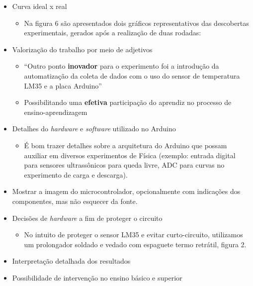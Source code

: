 \documentclass{article}
\begin{document}
\begin{itemize}
\begin{itemize}
\begin{itemize}
			\item No total, 96 ensaios foram realizados no intervalo de 480 minutos (média de 5 minutos por ensaio). Por fim, foram calculados o percentual [\dots] \cite{rogerio}
		\end{itemize}
		\item Curva ideal x real
		\begin{itemize}
			\item Na figura 6 são apresentados dois gráficos representativos das descobertas experimentais, gerados após a realização de duas rodadas: \cite{rogerio}
		\end{itemize}
		\item Valorização do trabalho por meio de adjetivos
		\begin{itemize}
			\item ``Outro ponto \textbf{inovador} para o experimento foi a introdução da automatização da coleta de dados com o uso do sensor de temperatura LM35 e a placa Arduino'' \cite{newton}
			\item Possibilitando uma \textbf{efetiva} participação do aprendiz no processo de ensino-aprendizagem \cite{newton}
		\end{itemize}
		\item Detalhes do \textit{hardware} e \textit{software} utilizado no Arduino
		\begin{itemize}
			\item É bom trazer detalhes sobre a arquitetura do Arduino que possam auxiliar em diversos experimentos de Física (exemplo: entrada digital para sensores ultrassônicos para queda livre, ADC para curvas no experimento de carga e descarga).
		\end{itemize}
		\item Mostrar a imagem do microcontrolador, opcionalmente com indicações dos componentes, mas não esquecer da fonte. \cite{newton}
		\item Decisões de \textit{hardware} a fim de proteger o circuito
		\begin{itemize}
		\item No intuito de proteger o sensor LM35 e evitar curto-circuito, utilizamos um prolongador soldado e vedado com espaguete termo retrátil, figura 2. \cite{newton}
		\end{itemize}
		\item Interpretação detalhada dos resultados \cite{newton}
		\item Possibilidade de intervenção no ensino básico e superior
		\begin{itemize}

\end{itemize}
\end{itemize}
\end{itemize}
\end{document}
